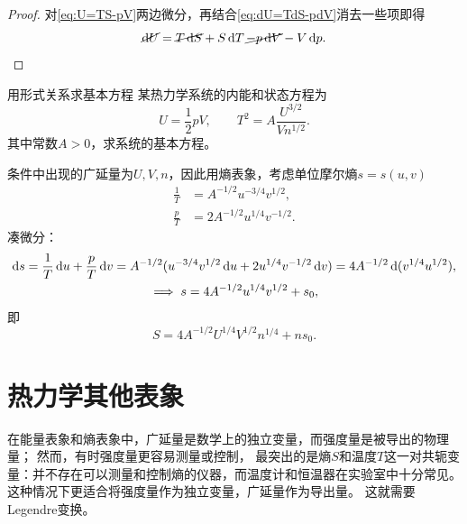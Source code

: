 \begin{proof}
	对\eqref{eq:U=TS-pV}两边微分，再结合\eqref{eq:dU=TdS-pdV}消去一些项即得
	\[
		\cancel{\mathop{}\!\mathrm{d} U}=\cancel{T\mathop{}\!\mathrm{d} S}+S\mathop{}\!\mathrm{d} T\,\cancel{-p\mathop{}\!\mathrm{d} V}-V\mathop{}\!\mathrm{d} p.
		\qedhere
	\]
\end{proof}

\begin{example}{用形式关系求基本方程}{}
	某热力学系统的内能和状态方程为
	\[
		U=\frac12pV,\qquad T^2=A\frac{U^{3/2}}{Vn^{1/2}}.
	\]
	其中常数$A>0$，求系统的基本方程。

	条件中出现的广延量为$U,V,n$，因此用熵表象，考虑单位摩尔熵$s=s(u,v)$
	\begin{align*}
		\frac1T&=A^{-1/2}u^{-3/4}v^{1/2},\\
		\frac pT&=2A^{-1/2}u^{1/4}v^{-1/2}.
	\end{align*}
	凑微分：
	\begin{gather*}
		\mathop{}\!\mathrm{d} s=\frac1T\mathop{}\!\mathrm{d} u+\frac pT\mathop{}\!\mathrm{d} v=A^{-1/2}(u^{-3/4}v^{1/2}\mathop{}\!\mathrm{d} u+2u^{1/4}v^{-1/2}\mathop{}\!\mathrm{d} v)=4A^{-1/2}\mathop{}\!\mathrm{d}(v^{1/4}u^{1/2}),\\
		\implies
		s=4A^{-1/2}u^{1/4}v^{1/2}+s_0,
	\end{gather*}
	即
	\[
		S=4A^{-1/2}U^{1/4}V^{1/2}n^{1/4}+ns_0.
	\]
\end{example}

\section{热力学其他表象}

在能量表象和熵表象中，广延量是数学上的独立变量，而强度量是被导出的物理量；%
然而，有时强度量更容易测量或控制，
最突出的是熵$S$和温度$T$这一对共轭变量：并不存在可以测量和控制熵的仪器，而温度计和恒温器在实验室中十分常见。
这种情况下更适合将强度量作为独立变量，广延量作为导出量。
这就需要Legendre变换。


